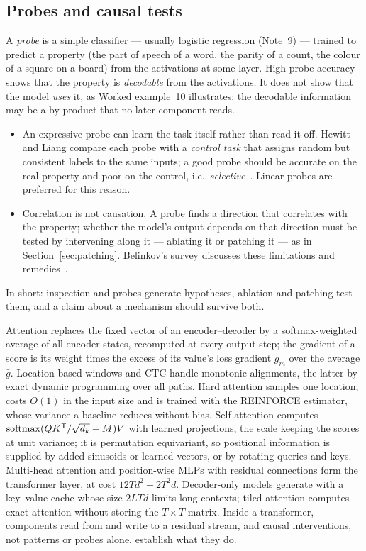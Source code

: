 \documentclass[11pt]{article}
\newcommand{\softmax}{\operatorname{softmax}}
\begin{document}
\subsection{Probes and causal tests}\label{sec:probes}

A \emph{probe} is a simple classifier --- usually logistic regression (Note~9) --- trained to predict a property (the part
of speech of a word, the parity of a count, the colour of a square on a board) from the activations at some layer. High probe
accuracy shows that the property is \emph{decodable} from the activations. It does not show that the model \emph{uses} it,
as Worked example~10 illustrates: the decodable information may be a by-product that no later component reads.
\begin{itemize}
\item An expressive probe can learn the task itself rather than read it off. Hewitt and Liang compare each probe with a
  \emph{control task} that assigns random but consistent labels to the same inputs; a good probe should be accurate on the
  real property and poor on the control, i.e.\ \emph{selective}~\cite{hewitt2019}. Linear probes are preferred for this
  reason.
\item Correlation is not causation. A probe finds a direction that correlates with the property; whether the model's output
  depends on that direction must be tested by intervening along it --- ablating it or patching it --- as in
  Section~\ref{sec:patching}. Belinkov's survey discusses these limitations and remedies~\cite{belinkov2022}.
\end{itemize}
In short: inspection and probes generate hypotheses, ablation and patching test them, and a claim about a mechanism should
survive both.

\begin{keyidea}[Summary]
Attention replaces the fixed vector of an encoder--decoder by a softmax-weighted average of all encoder states, recomputed at
every output step; the gradient of a score is its weight times the excess of its value's loss gradient $g_m$ over the
average $\bar g$. Location-based
windows and CTC handle monotonic alignments, the latter by exact dynamic programming over all paths. Hard attention samples
one location, costs $O(1)$ in the input size and is trained with the REINFORCE estimator, whose variance a baseline reduces
without bias. Self-attention computes $\softmax(QK\T/\sqrt{d_k} + M)V$ with learned projections, the scale keeping the
scores at unit variance; it is permutation equivariant, so positional information is supplied by added sinusoids or
learned vectors, or by rotating queries and keys.
Multi-head attention and position-wise MLPs with residual connections form the transformer layer, at cost
$12Td^2 + 2T^2d$. Decoder-only models generate with a key--value cache whose size $2LTd$ limits long contexts;
tiled attention computes exact attention without storing the $T \times T$ matrix. Inside a transformer, components read
from and write to a residual stream, and causal interventions, not patterns or probes alone, establish what they do.
\end{keyidea}
\end{document}
